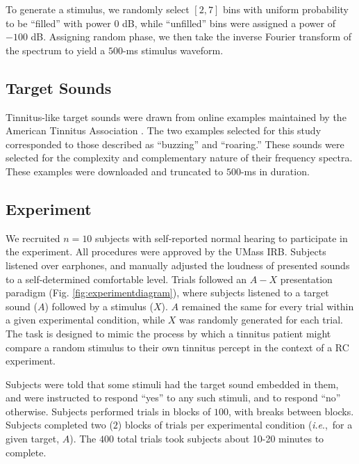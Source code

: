 \documentclass[journal]{IEEEtran}
\newcommand{\ie}{\textit{i}.\textit{e}.,\ }
\begin{document}
To generate a stimulus, we randomly select $[2,7]$ bins with uniform probability to be ``filled'' with power $0$ dB,
while ``unfilled'' bins were assigned a power of $-100$ dB. 
Assigning random phase, we then take the inverse Fourier transform of the spectrum to yield a $500$-ms stimulus waveform.

\subsection{Target Sounds}

Tinnitus-like target sounds were drawn from online examples maintained by the American Tinnitus Association
\cite{MeasuringTinnitusAmerican2022}.
The two examples selected for this study corresponded to those described as ``buzzing'' and ``roaring.''
These sounds were selected for the complexity and complementary nature of their frequency spectra.
These examples were downloaded and truncated to $500$-ms in duration. 

\subsection{Experiment}

We recruited $n=10$ subjects with self-reported normal hearing to participate in the experiment.
All procedures were approved by the UMass IRB.
Subjects listened over earphones, and manually adjusted the loudness of presented sounds to a self-determined comfortable level.
Trials followed an $A-X$ presentation paradigm (Fig. \ref{fig:experimentdiagram}),
where subjects listened to a target sound ($A$) followed by a stimulus ($X$).
$A$ remained the same for every trial within a given experimental condition,
while $X$ was randomly generated for each trial.
The task is designed to mimic the process by which a tinnitus patient might compare a random stimulus to their own tinnitus percept in the context of a RC experiment.

Subjects were told that some stimuli had the target sound embedded in them, and were instructed to respond ``yes'' to any such stimuli, and to respond ``no'' otherwise.
Subjects performed trials in blocks of $100$, with breaks between blocks.
Subjects completed two ($2$) blocks of trials per experimental condition (\ie for a given target, $A$).
The $400$ total trials took subjects about 10-20 minutes to complete.
\end{document}
